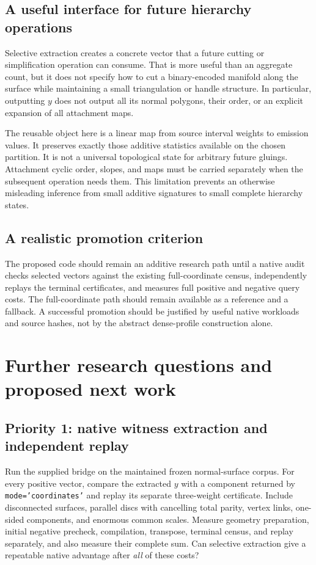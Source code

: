 \documentclass[11pt]{article}
\theoremstyle{definition}\newtheorem{definition}[theorem]{Definition}
\theoremstyle{remark}\newtheorem{remark}[theorem]{Remark}
\begin{document}
\subsection{A useful interface for future hierarchy operations}
Selective extraction creates a concrete vector that a future cutting or
simplification operation can consume. That is more useful than an aggregate
count, but it does not specify how to cut a binary-encoded manifold along the
surface while maintaining a small triangulation or handle structure. In
particular, outputting $y$ does not output all its normal polygons, their order,
or an explicit expansion of all attachment maps.

The reusable object here is a linear map from source interval weights to
emission values. It preserves exactly those additive statistics available on the
chosen partition. It is not a universal topological state for arbitrary future
gluings. Attachment cyclic order, slopes, and maps must be carried separately
when the subsequent operation needs them. This limitation prevents an otherwise
misleading inference from small additive signatures to small complete hierarchy
states.

\subsection{A realistic promotion criterion}
The proposed code should remain an additive research path until a native audit
checks selected vectors against the existing full-coordinate census, independently
replays the terminal certificates, and measures full positive and negative query
costs. The full-coordinate path should remain available as a reference and a
fallback. A successful promotion should be justified by useful native workloads
and source hashes, not by the abstract dense-profile construction alone.

\section{Further research questions and proposed next work}
\label{sec:questions}

\subsection{Priority 1: native witness extraction and independent replay}
Run the supplied bridge on the maintained frozen normal-surface corpus. For every
positive vector, compare the extracted $y$ with a component returned by
\texttt{mode='coordinates'} and replay its separate three-weight certificate.
Include disconnected surfaces, parallel discs with cancelling total parity,
vertex links, one-sided components, and enormous common scales. Measure geometry
preparation, initial negative precheck, compilation, transpose, terminal census,
and replay separately, and also measure their complete sum. Can selective
extraction give a repeatable native advantage after \emph{all} of these costs?
\end{document}
